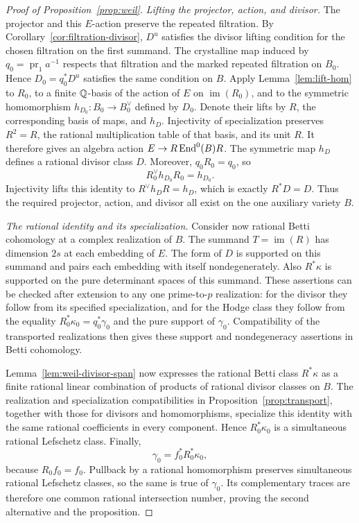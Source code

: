 \begin{proof}[Proof of Proposition~\ref{prop:weil}]
\medskip\noindent
\emph{Lifting the projector, action, and divisor.}
The projector and this $E$-action preserve the repeated filtration.
By Corollary~\ref{cor:filtration-divisor}, $D^u$ satisfies the divisor
lifting condition for the chosen filtration on the first summand.
The crystalline map induced by $q_0=\operatorname{pr}_1a^{-1}$
respects that filtration and the marked repeated filtration on $B_0$.
Hence $D_0=q_0^*D^u$ satisfies the same condition on $B$.
Apply Lemma~\ref{lem:lift-hom} to \(R_0\), to a finite
\(\mathbb Q\)-basis of the action of \(E\) on \(\operatorname{im}(R_0)\), and to the
symmetric homomorphism \(h_{D_0}:B_0\to B_0^\vee\) defined by \(D_0\).
Denote their lifts by \(R\), the corresponding basis of maps, and
\(h_D\). Injectivity of specialization preserves \(R^2=R\), the
rational multiplication table of that basis, and its unit \(R\).
It therefore gives an algebra action \(E\to R\operatorname{End}^0(B)R\).
The symmetric map \(h_D\) defines a rational divisor class \(D\).
Moreover, \(q_0R_0=q_0\), so
\[
 R_0^\vee h_{D_0}R_0=h_{D_0}.
\]
Injectivity lifts this identity to \(R^\vee h_DR=h_D\), which is
exactly \(R^*D=D\). Thus the required projector, action, and divisor
all exist on the one auxiliary variety $B$.

\medskip\noindent
\emph{The rational identity and its specialization.}
Consider now rational Betti cohomology at a complex realization of
$B$.  The summand $T=\operatorname{im}(R)$ has dimension $2s$ at
each embedding of $E$.  The form of $D$ is supported on this summand
and pairs each embedding with itself nondegenerately.  Also
$R^*\kappa$ is supported on the pure determinant spaces of this
summand.  These assertions can be checked after extension to any
one prime-to-$p$ realization: for the divisor they follow from its
specified specialization, and for the Hodge class they follow from
the equality $R_0^*\kappa_0=q_0^*\gamma_0$ and the
pure support of $\gamma_0$.  Compatibility of the transported
realizations then gives these support and nondegeneracy assertions
in Betti cohomology.

Lemma~\ref{lem:weil-divisor-span} now expresses the rational Betti
class $R^*\kappa$ as a finite rational linear combination of products
of rational divisor classes on $B$.  The realization and
specialization compatibilities in
Proposition~\ref{prop:transport}, together with those for divisors
and homomorphisms, specialize this identity with the same rational
coefficients in every component.  Hence $R_0^*\kappa_0$ is a
simultaneous rational Lefschetz class.  Finally,
\[
 \gamma_0=f_0^*R_0^*\kappa_0,
\]
because $R_0f_0=f_0$.  Pullback by a rational homomorphism preserves
simultaneous rational Lefschetz classes, so the same is true of
$\gamma_0$.  Its complementary traces are therefore one common
rational intersection number, proving the second alternative and
the proposition.
\end{proof}

